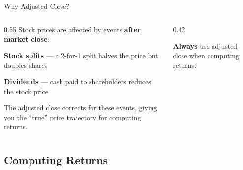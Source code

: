 \documentclass[9pt,aspectratio=169]{beamer}
\begin{document}
\begin{frame}{Why Adjusted Close?}

\begin{columns}[T]
\begin{column}{0.55\textwidth}
Stock prices are affected by events \textbf{after market close}:

\medskip

\bi
    \item \textbf{Stock splits} --- a 2-for-1 split halves the price but doubles shares
    \item \textbf{Dividends} --- cash paid to shareholders reduces the stock price
\ei

\medskip

The \alert{adjusted close} corrects for these events, giving you the ``true'' price trajectory for computing returns.
\end{column}
\begin{column}{0.42\textwidth}
\centering
{}

\bigskip

\begin{highlightbox}
\centering
\textbf{Always} use adjusted close when computing returns.
\end{highlightbox}
\end{column}
\end{columns}

\end{frame}


\subsection{Computing Returns}
\end{document}
